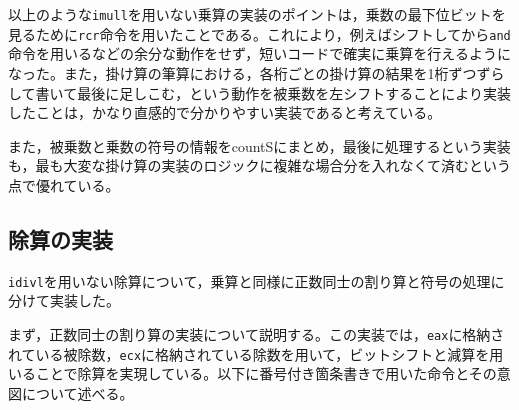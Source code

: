 \documentclass[a4paper]{jsarticle}
\newcommand{\var}[1]{\texttt{#1}}
\begin{document}
以上のような\var{imull}を用いない乗算の実装のポイントは，乗数の最下位ビットを見るために\var{rcr}命令を用いたことである。これにより，例えばシフトしてから\var{and}命令を用いるなどの余分な動作をせず，短いコードで確実に乗算を行えるようになった。また，掛け算の筆算における，各桁ごとの掛け算の結果を1桁ずつずらして書いて最後に足しこむ，という動作を被乗数を左シフトすることにより実装したことは，かなり直感的で分かりやすい実装であると考えている。

また，被乗数と乗数の符号の情報をcountSにまとめ，最後に処理するという実装も，最も大変な掛け算の実装のロジックに複雑な場合分を入れなくて済むという点で優れている。

\subsection{除算の実装}

\var{idivl}を用いない除算について，乗算と同様に正数同士の割り算と符号の処理に分けて実装した。

まず，正数同士の割り算の実装について説明する。この実装では，\var{eax}に格納されている被除数，\var{ecx}に格納されている除数を用いて，ビットシフトと減算を用いることで除算を実現している。以下に番号付き箇条書きで用いた命令とその意図について述べる。
\end{document}
